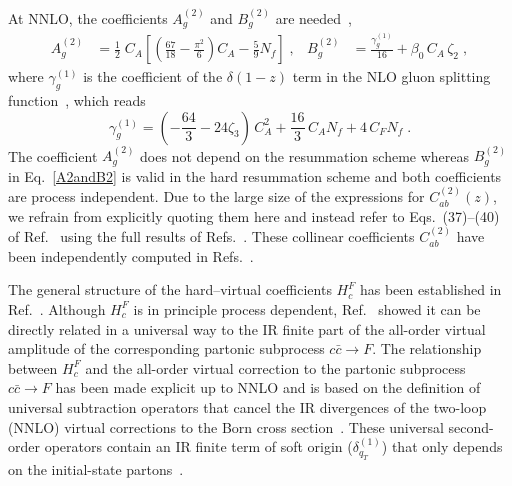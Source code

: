 \documentclass[12pt]{article}
\DeclareRobustCommand{\qt}{\ensuremath{q_T}\xspace}
\begin{document}
\begin{appendix}
At NNLO, the coefficients $A^{(2)}_{g}$ and $B^{(2)}_{g}$ are needed~\cite{Bozzi:2005wk,Catani:2013tia,deFlorian:2001zd},
\begin{align}
  A^{(2)}_{g} &= 
  \frac{1}{2}\; C_A \left[ 
    \left( \frac{67}{18} - \frac{\pi^2}{6}\right) C_A 
    -\frac{5}{9} N_f 
  \right] \;, &
  B^{(2)}_{g} &=
  \frac{\gamma_{g}^{(1)}}{16}+\beta_0\, C_A\,\zeta_2 \;,
  \label{A2andB2}
\end{align}
where $\gamma_{g}^{(1)}$ is the coefficient of the $\delta(1-z)$ term in the NLO gluon splitting function~\cite{Curci:1980uw,Furmanski:1980cm}, which reads
\begin{equation}
  \gamma_{g}^{(1)} = 
  \left(-\frac{64}3-24\zeta_3\right)\,C_A^2
  +\frac{16}3\,C_A N_f
  +4\,C_F N_f\;.
  \label{ga1g}
\end{equation}
The coefficient $A^{(2)}_{g}$ does not depend on the resummation scheme whereas $B^{(2)}_{g}$  in Eq.~\eqref{A2andB2} is valid in the hard resummation scheme and both coefficients are process independent. Due to the large size of the expressions for $C_{ab}^{(2)}(z)$, we refrain from explicitly quoting them here and instead refer to Eqs.~(37)--(40) of Ref.~\cite{Catani:2013tia} using the full results of Refs.~\cite{Catani:2011kr,Catani:2012qa}. These collinear coefficients $C^{(2)}_{ab}$ have been independently computed in Refs.~\cite{Gehrmann:2012ze,Echevarria:2016scs}.

The general structure of the hard--virtual coefficients $H^{F}_{c}$ has been established in Ref.~\cite{Catani:2013tia}. Although $H^{F}_{c}$ is in principle process dependent, Ref.~\cite{Catani:2013tia} showed it can be directly related in a universal way to the IR finite part of the all-order virtual amplitude of the corresponding partonic subprocess $c{\bar c}\to F$. The relationship between $H^{F}_{c}$ and the all-order virtual correction to the  partonic subprocess $c{\bar c}\to F$ has been made explicit up to NNLO and is based on the definition of universal subtraction operators that cancel the IR divergences of the two-loop (NNLO) virtual corrections to the Born cross section~\cite{Catani:1998bh}. These universal second-order operators contain an IR finite term of soft origin ($\delta^{(1)}_{\qt}$) that only depends on the initial-state partons~\cite{Catani:2013tia}.


\end{appendix}
\end{document}
